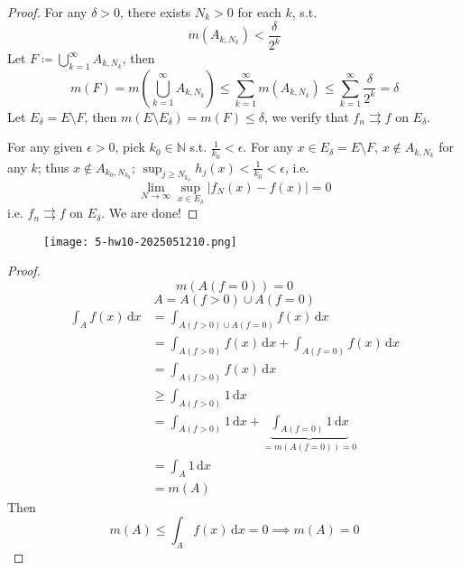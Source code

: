 \begin{proof}
For any $\delta>0$, there exists $N_k>0$ for each $k$, s.t.
\[
m(A_{k,N_k})<\frac{\delta}{2^{k}}
\]
Let $F\coloneqq\bigcup_{k=1}^{\infty}A_{k,N_k}$, then
\[
m(F)=m\left( \bigcup_{k=1}^{\infty} A_{k,N_k} \right)\leq \sum_{k=1}^{\infty} m(A_{k,N_k})\leq \sum_{k=1}^{\infty} \frac{\delta}{2^{k}}=\delta
\]
Let $E_{\delta}=E\setminus F$, then $m(E\setminus E_{\delta})=m(F)\leq\delta$, we verify that $f_n\rightrightarrows f$ on $E_{\delta}$.

For any given $\epsilon>0$, pick $k_0\in \mathbb{N}$ s.t. $\frac{1}{k_0}<\epsilon$. For any $x\in E_{\delta}=E\setminus F$, $x\not\in A_{k,N_k}$ for any $k$; thus $x\not\in A_{k_0,N_{k_0}}$; $\sup_{j\geq N_{k_0}}h_j(x)<\frac{1}{k_0}<\epsilon$, i.e.
\[
\lim_{ N \to \infty } \sup_{x\in E_{\delta}}\lvert f_{N}(x)-f(x) \rvert =0 
\]
i.e. $f_n\rightrightarrows f$ on $E_{\delta}$. We are done!
\end{proof}

\begin{exercise}
\begin{figure}[H]
\centering
\texttt{[image: 5-hw10-2025051210.png]}
\label{}
\end{figure}\label{34ffe7}
\end{exercise}

\begin{proof}
\[
m(A(f=0))=0
\]
\[
A=A(f>0)\cup A(f=0)
\]
\[
\begin{aligned}
\int_{A}^{} f(x) \, \mathrm{d}x  & =\int_{A(f>0)\cup A(f=0)}^{} f(x) \, \mathrm{d}x  \\
 & =\int_{A(f>0)}^{} f(x) \, \mathrm{d}x +\int_{A(f=0)}^{} f(x) \, \mathrm{d}x  \\
 & =\int_{A(f>0)}^{} f(x) \, \mathrm{d}x \\
 & \geq \int_{A(f>0)}^{}  1\, \mathrm{d}x  \\
 & =\int_{A(f>0)}^{}  1\, \mathrm{d}x+\underbrace{ \int_{A(f=0)}^{} 1 \, \mathrm{d}x   }_{ =m(A(f=0))=0 } \\
 & =\int_{A}^{} 1 \, \mathrm{d}x  \\
 & =m(A)
\end{aligned}
\]
Then
\[
m(A)\leq \int_{A}^{} f(x) \, \mathrm{d}x =0\implies m(A)=0
\]
\end{proof}

